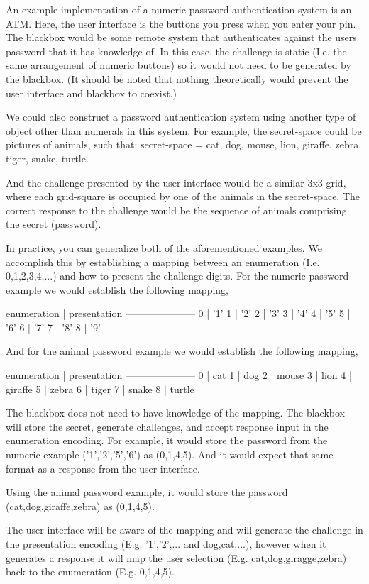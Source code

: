 \documentclass[12pt]{document}
\begin{document}
\begin{Introduction}
An example implementation of a numeric password authentication system is an ATM.
Here, the user interface is the buttons you press when you enter your pin.  The blackbox would be some remote system that authenticates against the users password that it has knowledge of. In this case, the challenge is static (I.e. the same arrangement of numeric buttons) so it would not need to be generated by the blackbox. (It should be noted that nothing theoretically would prevent the user interface and blackbox to coexist.)




We could also construct a password authentication system using another type of object other than numerals in this system. For example, the secret-space could be pictures of animals, such that:
secret-space = {cat, dog, mouse, lion, giraffe, zebra, tiger, snake, turtle}.

And the challenge presented by the user interface would be a similar 3x3 grid, where each grid-square is occupied by one of the animals in the secret-space.
The correct response to the challenge would be the sequence of animals comprising the secret (password).

In practice, you can generalize both of the aforementioned examples.
We accomplish this by establishing a mapping between an enumeration (I.e. 0,1,2,3,4,...) and how to present the challenge digits.
For the numeric password example we would establish the following mapping,

enumeration | presentation 
---------------------
0 | '1'
1 | '2'
2 | '3'
3 | '4'
4 | '5'
5 | '6'
6 | '7'
7 | '8'
8 | '9'

And for the animal password example we would establish the following mapping,

enumeration | presentation
---------------------
0 | cat
1 | dog
2 | mouse
3 | lion
4 | giraffe
5 | zebra
6 | tiger
7 | snake
8 | turtle


The blackbox does not need to have knowledge of the mapping. The blackbox will store the secret, generate challenges, and accept response input in the enumeration encoding.
For example, it would store the password from the numeric example ('1','2','5','6') as (0,1,4,5). And it would expect that same format as a response from the user interface.

Using the animal password example, it would store the password (cat,dog,giraffe,zebra) as (0,1,4,5).

The user interface will be aware of the mapping and will generate the challenge in the presentation encoding (E.g. '1','2',... and dog,cat,...), however when it generates a response it will map the user selection (E.g. cat,dog,giragge,zebra) back to the enumeration (E.g. 0,1,4,5).



\end{Introduction}
\end{document}
